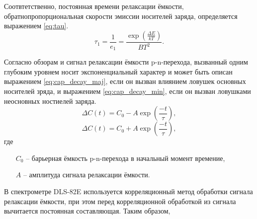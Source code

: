     Соотвтетственно, постоянная времени релаксации ёмкости, обратнопропорциональная
    скорости эмиссии носителей заряда, определяется выражением \ref{eq:tau}.
    \begin{equation}
        \label{eq:tau}
        \tau_1 = \frac{1}{e_1} = \frac{\exp\left(\frac{\Delta E}{kT}\right)}{BT^2}.
    \end{equation}

    Согласно обзорам \cite{Peaker_DLTS_review_2018} и \cite{Tin_DLTS_2012} сигнал 
    релаксации ёмкости p-n-перехода, вызванный одним глубоким уровнем носит
    экспоненциальный характер и может быть описан выражением
    \ref{eq:cap_decay_maj}, если он вызван влиянием ловушек основных носителей
    зряда, и выражением \ref{eq:cap_decay_min}, если он вызван ловушками 
    неосновных ностиелей заряда.
    \begin{equation}
        \label{eq:cap_decay_maj}
       \Delta C\left(t\right) = C_0-A\exp{\left(\frac{-t}{\tau}\right)},
    \end{equation}
    \begin{equation}
        \label{eq:cap_decay_min}
        \Delta C\left(t\right) = C_0+A\exp{\left(\frac{-t}{\tau}\right)},
    \end{equation}
    где 
    \begin{enumerate}
        \item[$C_0$] -- барьерная ёмкость p-n-перехода в начальный момент времение,
        \item[$A$] -- амплитуда сигнала релаксации ёмкости.
    \end{enumerate}

    В спектрометре DLS-82E используется корреляционный метод обработки сигнала
    релаксации ёмкости, при этом перед корреляционной обработкой из сигнала
    вычитается постоянная составляющая. Таким образом,


